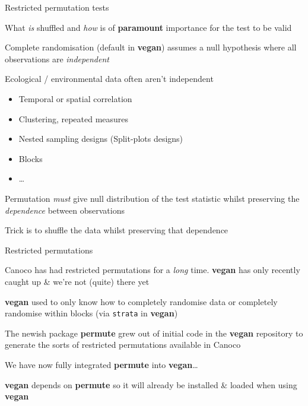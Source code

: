 \documentclass[10pt,ignorenonframetext,compress, aspectratio=169]{beamer}
\begin{document}
\begin{frame}{Restricted permutation tests}

What \emph{is} shuffled and \emph{how} is of \textbf{paramount}
importance for the test to be valid

Complete randomisation (default in \textbf{vegan}) assumes a null
hypothesis where all observations are \emph{independent}

Ecological / environmental data often aren't independent

\begin{itemize}
\itemsep1pt\parskip0pt
\item
  Temporal or spatial correlation
\item
  Clustering, repeated measures
\item
  Nested sampling designs (Split-plots designs)
\item
  Blocks
\item
  \ldots{}
\end{itemize}

Permutation \emph{must} give null distribution of the test statistic
whilst preserving the \emph{dependence} between observations

Trick is to shuffle the data whilst preserving that dependence

\end{frame}

\begin{frame}{Restricted permutations}

Canoco has had restricted permutations for a \emph{long} time.
\textbf{vegan} has only recently caught up \& we're not (quite) there
yet

\textbf{vegan} used to only know how to completely randomise data or
completely randomise within blocks (via \texttt{strata} in
\textbf{vegan})

The newish package \textbf{permute} grew out of initial code in the
\textbf{vegan} repository to generate the sorts of restricted
permutations available in Canoco

We have now fully integrated \textbf{permute} into
\textbf{vegan}\ldots{}

\textbf{vegan} depends on \textbf{permute} so it will already be
installed \& loaded when using \textbf{vegan}

\end{frame}
\end{document}
